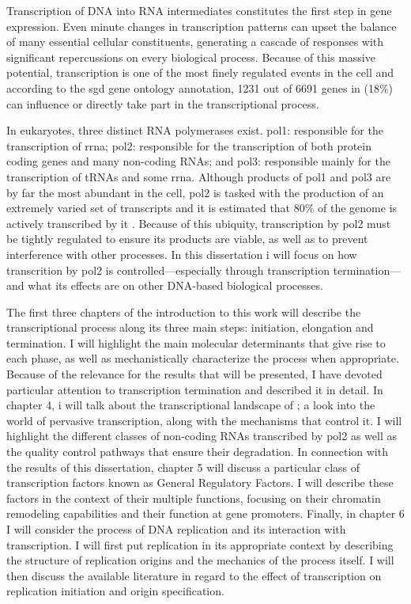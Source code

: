 Transcription of DNA into RNA intermediates constitutes the first step in gene expression.
Even minute changes in transcription patterns can upset the balance of many essential cellular constituents, generating a cascade of responses with significant repercussions on every biological process.
Because of this massive potential, transcription is one of the most finely regulated events in the cell and according to the \gls{sgd} \cite{cherry:2012:saccharomyces} gene ontology annotation, 1231 out of 6691 genes in \cer{} (18\%) can influence or directly take part in the transcriptional process.

In eukaryotes, three distinct RNA polymerases exist. 
\gls{pol1}: responsible for the transcription of \gls{rrna}; \gls{pol2}: responsible for the transcription of both protein coding genes and many non-coding RNAs; and \gls{pol3}: responsible mainly for the transcription of tRNAs and some \gls{rrna}.
Although products of \gls{pol1} and \gls{pol3} are by far the most abundant in the cell, \gls{pol2} is tasked with the production of an extremely varied set of transcripts and it is estimated that 80\% of the genome is actively transcribed by it \cite{david:2006:highresolution}. 
Because of this ubiquity, transcription by \gls{pol2} must be tightly regulated to ensure its products are viable, as well as to prevent interference with other processes.
In this dissertation i will focus on how transcrition by \gls{pol2} is controlled---especially through transcription termination---and what its effects are on other DNA-based biological processes.

The first three chapters of the introduction to this work will describe the transcriptional process along its three main steps: initiation, elongation and termination. I will highlight the main molecular determinants that give rise to each phase, as well as mechanistically characterize the process when appropriate. 
Because of the relevance for the results that will be presented, I have devoted particular attention to transcription termination and described it in detail.
In chapter 4, i will talk about the transcriptional landscape of \cer{}; a look into the world of pervasive transcription, along with the mechanisms that control it. I will highlight the different classes of non-coding RNAs transcribed by \gls{pol2} as well as the quality control pathways that ensure their degradation.
In connection with the results of this dissertation, chapter 5 will discuss a particular class of transcription factors known as General Regulatory Factors. I will describe these factors in the context of their multiple functions, focusing on their chromatin remodeling capabilities and their function at gene promoters.
Finally, in chapter 6 I will consider the process of DNA replication and its interaction with transcription.
I will first put replication in its appropriate context by describing the structure of replication origins and the mechanics of the process itself. I will then discuss the available literature in regard to the effect of transcription on replication initiation and origin specification.

